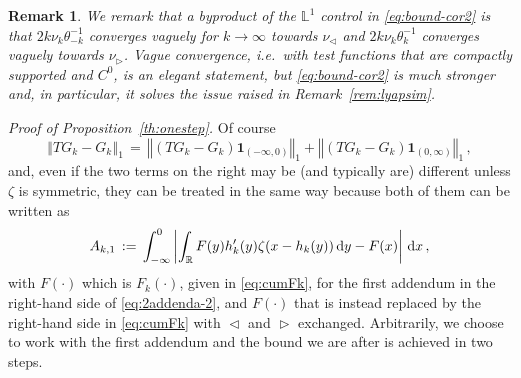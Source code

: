 \documentclass[reqno,11pt]{amsart}
\numberwithin{equation}{section}
\newtheorem{rem}[theorem]{Remark}
\newcommand{\ind}{\mathbf{1}}
\newcommand{\dd}{\,\text{\rm d}}             %
\newcommand{\bbL}{{\ensuremath{\mathbb L}} }
\newcommand{\bbR}{{\ensuremath{\mathbb R}} }
\newcommand{\gz}{\zeta}
\newcommand{\lar}{\vartriangleleft}
\newcommand{\rar}{\vartriangleright}
\begin{document}
\begin{rem}
\label{rem:vague}
We remark that a byproduct of the $\bbL^1$ control in \eqref{eq:bound-cor2} is that 
$2k \nu_k \theta_{-k}^{-1}$ converges vaguely for $k \to \infty$ towards $\nu_\lar$ and  $2k \nu_k \theta_k^{-1}$ converges vaguely towards $\nu_\rar$. Vague convergence, i.e.\ with test functions that are compactly supported and $C^0$,  is an elegant statement, but \eqref{eq:bound-cor2}  is much stronger and, in particular, it solves the issue raised in Remark~\ref{rem:lyapsim}.
\end{rem}


\medskip


\noindent
\emph{Proof of Proposition~\ref{th:onestep}.}
Of course
\begin{equation}
\label{eq:2addenda-2}
\left\Vert T G_k - G_k \right \Vert_1\, =\, 
\left\Vert (T G_k - G_k )\ind_{(-\infty,0)}\right \Vert_1 + \left\Vert (T G_k - G_k )\ind_{(0, \infty)}\right \Vert_1\, ,
\end{equation}
and, even if the two terms on the right may be (and typically are) different unless $\gz$ is symmetric, 
they can be treated in the same way because
both of them can be written as 
\begin{equation}
A_{k,1}\, :=\,\int_{-\infty}^0 \left \vert  \int_ \bbR F(y) h'_k(y) \gz( x-h_k(y)) \dd y - F(x) \right\vert  \dd x\, , 
\end{equation}
 with $F(\cdot)$ which is $F_k(\cdot)$, given in \eqref{eq:cumFk},  for the first 
 addendum in  the right-hand side of \eqref{eq:2addenda-2}, and $F(\cdot)$ that is instead replaced by the right-hand side in \eqref{eq:cumFk} with $ \lar$ and $\rar$ exchanged.
 Arbitrarily, we choose to work with the first addendum and the bound we are after is achieved in two steps.
\end{document}
